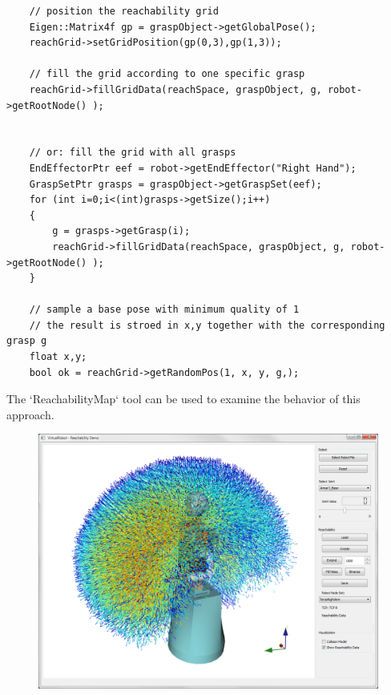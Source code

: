 \documentclass{book}
\begin{document}
\begin{itemize}
\begin{lstlisting}
    // position the reachability grid
    Eigen::Matrix4f gp = graspObject->getGlobalPose();
    reachGrid->setGridPosition(gp(0,3),gp(1,3));

    // fill the grid according to one specific grasp
    reachGrid->fillGridData(reachSpace, graspObject, g, robot->getRootNode() );


    // or: fill the grid with all grasps
    EndEffectorPtr eef = robot->getEndEffector("Right Hand");
    GraspSetPtr grasps = graspObject->getGraspSet(eef);
    for (int i=0;i<(int)grasps->getSize();i++)
    {
        g = grasps->getGrasp(i);
        reachGrid->fillGridData(reachSpace, graspObject, g, robot->getRootNode() );
    }

    // sample a base pose with minimum quality of 1
    // the result is stroed in x,y together with the corresponding grasp g
    float x,y;
    bool ok = reachGrid->getRandomPos(1, x, y, g,);
\end{lstlisting}
The `ReachabilityMap` tool can be used to examine the behavior of this approach.\par
\begin{figure}[H]
	\centering
	\begin{minipage} {.45\linewidth}
	  \includegraphics[width=\linewidth]{Reachability_HipRightArm_ArmarIII}
	\end{minipage}
	\begin{minipage} {.45\linewidth}

\end{minipage}
\end{figure}
\end{itemize}
\end{document}
